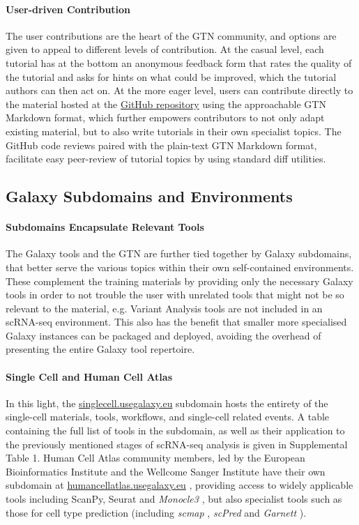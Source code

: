\documentclass[a4paper,num-refs]{oup-contemporary}
\newcommand{\prog}[1]{\textit{#1}} %
\begin{document}
\paragraph{User-driven Contribution}
The user contributions are the heart of the GTN community, and options are given to appeal to different levels of contribution. At the casual level, each tutorial has at the bottom an anonymous feedback form that rates the quality of the tutorial and asks for hints on what could be improved, which the tutorial authors can then act on. At the more eager level, users can contribute directly to the material hosted at the \href{https://github.com/galaxyproject/training-material}{GitHub repository} using the approachable GTN Markdown format, which further empowers contributors to not only adapt existing material, but to also write tutorials in their own specialist topics. The GitHub code reviews paired with the plain-text GTN Markdown format, facilitate easy peer-review of tutorial topics by using standard diff utilities.

\subsection{Galaxy Subdomains and Environments}

\paragraph{Subdomains Encapsulate Relevant Tools}
The Galaxy tools and the GTN are further tied together by Galaxy subdomains, that better serve the various topics within their own self-contained environments. These complement the training materials by providing only the necessary Galaxy tools in order to not trouble the user with unrelated tools that might not be so relevant to the material, e.g. Variant Analysis tools are not included in an scRNA-seq environment. This also has the benefit that smaller more specialised Galaxy instances can be packaged and deployed, avoiding the overhead of presenting the entire Galaxy tool repertoire.

\paragraph{Single Cell and Human Cell Atlas}
In this light, the \url{singlecell.usegalaxy.eu} subdomain hosts the entirety of the single-cell materials, tools, workflows, and single-cell related events. A table containing the full list of tools in the subdomain, as well as their application to the previously mentioned stages of scRNA-seq analysis is given in Supplemental Table 1. %
Human Cell Atlas community members, led by the European Bioinformatics Institute and the Wellcome Sanger Institute have their own subdomain at \url{humancellatlas.usegalaxy.eu} \citep{moreno2020user}, providing access to widely applicable tools including ScanPy, Seurat and \prog{Monocle3} \citep{cao2019single}, but also specialist tools such as those for cell type prediction (including \prog{scmap} \citep{kiselev2018scmap}, \prog{scPred} \citep{alquicirahernandez2019scpred} and \prog{Garnett} \citep{pliner2019Garnett}).
\end{document}
